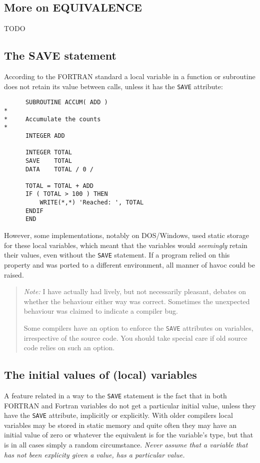 \subsection{More on EQUIVALENCE}
TODO


\subsection{The SAVE statement}
According to the FORTRAN standard a local variable in a function or
subroutine does not retain its value between calls, unless it has the
\verb+SAVE+ attribute:
%
\begin{verbatim}
      SUBROUTINE ACCUM( ADD )
*
*     Accumulate the counts
*
      INTEGER ADD

      INTEGER TOTAL
      SAVE    TOTAL
      DATA    TOTAL / 0 /

      TOTAL = TOTAL + ADD
      IF ( TOTAL > 100 ) THEN
          WRITE(*,*) 'Reached: ', TOTAL
      ENDIF
      END
\end{verbatim}

However, some implementations, notably on DOS/Windows, used static
storage for these local variables, which meant that the variables would
\emph{seemingly} retain their values, even without the \verb+SAVE+ statement.
If a program relied on this property and was ported to a different environment,
all manner of havoc could be raised.

\begin{quote}
\emph{Note:} I have actually had lively, but not necessarily pleasant, debates on
whether the behaviour either way was correct. Sometimes the unexpected
behaviour was claimed to indicate a compiler bug.

Some compilers have an option to enforce the \verb+SAVE+ attributes on variables,
irrespective of the source code. You should take special care if old source code
relies on such an option.
\end{quote}

\subsection{The initial values of (local) variables}
A feature related in a way to the \verb+SAVE+ statement is the fact that
in both FORTRAN and Fortran variables do not get a particular initial
value, unless they have the \verb+SAVE+ attribute, implicitly or explicitly.
With older compilers local variables may be stored in static memory and
quite often they may have an initial value of zero or whatever the
equivalent is for the variable's type, but that is in all cases simply
a random circumstance. \emph{Never assume that a variable that has not
been explicity given a value, has a particular value.}

